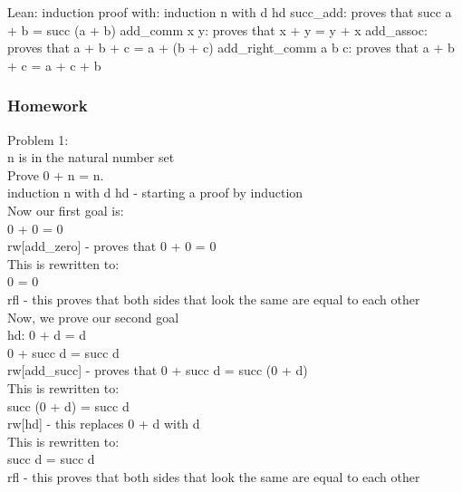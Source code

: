 \documentclass{article}
\theoremstyle{theorem}
\theoremstyle{definition}
\theoremstyle{remark}
\begin{document}
Lean:
induction proof with: induction n with d hd
succ\_add: proves that succ a + b = succ (a + b)
add\_comm x y: proves that x + y = y + x
add\_assoc: proves that a + b + c = a + (b + c)
add\_right\_comm a b c: proves that a + b + c = a + c + b 

\subsubsection*{Homework}
Problem 1:\\
n is in the natural number set\\
Prove 0 + n = n.\\
induction n with d hd - starting a proof by induction\\
Now our first goal is:\\
0 + 0 = 0\\
rw[add\_zero] - proves that 0 + 0 = 0\\
This is rewritten to:\\
0 = 0\\
rfl - this proves that both sides that look the same are equal to each other \\
Now, we prove our second goal\\
hd: 0 + d = d\\
0 + succ d = succ d \\
rw[add\_succ] - proves that 0 + succ d = succ (0 + d)\\
This is rewritten to:\\
succ (0 + d) = succ d\\
rw[hd] - this replaces 0 + d with d\\
This is rewritten to:\\
succ d = succ d\\
rfl - this proves that both sides that look the same are equal to each other \\
\end{document}
